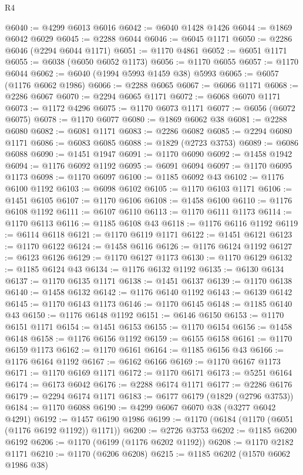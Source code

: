 \begin{lexlean}{R4}
\begin{coremodule}
@6040 := @4299 @6013 @6016
@6042 := @6040 @1428 @1426
@6044 := @1869 @6042 @6029
@6045 := @2288 @6044
@6046 := @6045 @1171
@6050 := @2286 @6046 (@2294 @6044 @1171)
@6051 := @1170 @4861
@6052 := @6051 @1171
@6055 := @6038 (@6050 @6052 @1173)
@6056 := @1170 @6055
@6057 := @1170 @6044
@6062 := @6040 (@1994 @5993 @1459 @38) @5993
@6065 := @6057 (@1176 @6062 @1986)
@6066 := @2288 @6065
@6067 := @6066 @1171
@6068 := @2286 @6067
@6070 := @2294 @6065 @1171
@6072 := @6068 @6070 @1171
@6073 := @1172 @4296
@6075 := @1170 @6073 @1171
@6077 := @6056 (@6072 @6075)
@6078 := @1170 @6077
@6080 := @1869 @6062 @38
@6081 := @2288 @6080
@6082 := @6081 @1171
@6083 := @2286 @6082
@6085 := @2294 @6080 @1171
@6086 := @6083 @6085
@6088 := @1829 (@2723 @3753)
@6089 := @6086 @6088
@6090 := @1451 @1947
@6091 := @1170 @6090
@6092 := @1458 @1942
@6094 := @1176 @6092 @1192
@6095 := @6091 @6094
@6097 := @1170 @6095 @1173
@6098 := @1170 @6097
@6100 := @1185 @6092 @43
@6102 := @1176 @6100 @1192
@6103 := @6098 @6102
@6105 := @1170 @6103 @1171
@6106 := @1451 @6105
@6107 := @1170 @6106
@6108 := @1458 @6100
@6110 := @1176 @6108 @1192
@6111 := @6107 @6110
@6113 := @1170 @6111 @1173
@6114 := @1170 @6113
@6116 := @1185 @6108 @43
@6118 := @1176 @6116 @1192
@6119 := @6114 @6118
@6121 := @1170 @6119 @1171
@6122 := @1451 @6121
@6123 := @1170 @6122
@6124 := @1458 @6116
@6126 := @1176 @6124 @1192
@6127 := @6123 @6126
@6129 := @1170 @6127 @1173
@6130 := @1170 @6129
@6132 := @1185 @6124 @43
@6134 := @1176 @6132 @1192
@6135 := @6130 @6134
@6137 := @1170 @6135 @1171
@6138 := @1451 @6137
@6139 := @1170 @6138
@6140 := @1458 @6132
@6142 := @1176 @6140 @1192
@6143 := @6139 @6142
@6145 := @1170 @6143 @1173
@6146 := @1170 @6145
@6148 := @1185 @6140 @43
@6150 := @1176 @6148 @1192
@6151 := @6146 @6150
@6153 := @1170 @6151 @1171
@6154 := @1451 @6153
@6155 := @1170 @6154
@6156 := @1458 @6148
@6158 := @1176 @6156 @1192
@6159 := @6155 @6158
@6161 := @1170 @6159 @1173
@6162 := @1170 @6161
@6164 := @1185 @6156 @43
@6166 := @1176 @6164 @1192
@6167 := @6162 @6166
@6169 := @1170 @6167 @1173
@6171 := @1170 @6169 @1171
@6172 := @1170 @6171
@6173 := @5251 @6164
@6174 := @6173 @6042
@6176 := @2288 @6174 @1171
@6177 := @2286 @6176
@6179 := @2294 @6174 @1171
@6183 := @6177 @6179 (@1829 (@2796 @3753))
@6184 := @1170 @6088
@6190 := @4299 @6067 @6070 @38 (@3277 @6042 @4291)
@6192 := @1457 @6190 @1986
@6199 := @1170 (@6184 (@1170 (@6051 (@1176 @6192 @1192)) @1171))
@6200 := @2726 @3753
@6202 := @1185 @6200 @6192
@6206 := @1170 (@6199 (@1176 @6202 @1192))
@6208 := @1170 @2182 @1171
@6210 := @1170 (@6206 @6208)
@6215 := @1185 @6202 (@1570 @6062 @1986 @38)

\end{coremodule}
\end{lexlean}
